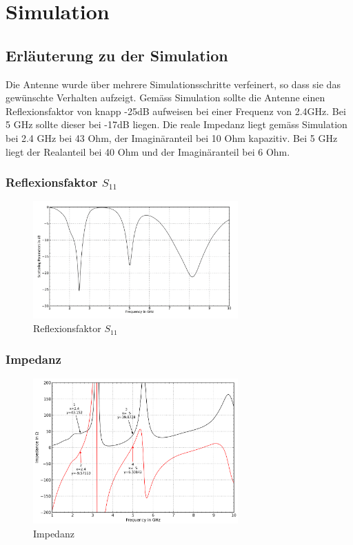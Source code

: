 \section{Simulation}

\subsection{Erläuterung zu der Simulation}
Die Antenne wurde über mehrere Simulationsschritte verfeinert, so dass sie das gewünschte Verhalten aufzeigt. Gemäss Simulation sollte die Antenne einen Reflexionsfaktor von knapp -25dB aufweisen bei einer Frequenz von 2.4GHz. Bei 5 GHz sollte dieser bei -17dB liegen. Die reale Impedanz liegt gemäss Simulation bei 2.4 GHz bei 43 Ohm, der Imaginäranteil bei 10 Ohm kapazitiv. Bei 5 GHz liegt der Realanteil bei 40 Ohm und der Imaginäranteil bei 6 Ohm.


\clearpage
\subsubsection{Reflexionsfaktor $S_{11}$}
\begin{figure}[h!]
	\centering
	\includegraphics[width=0.7\textwidth]{../fig/plt/crazy_stuff_l4_pcb_v2c_laptop_1a_105_S11_2.png}
	\caption{Reflexionsfaktor $S_{11}$}
\end{figure}

\subsubsection{Impedanz}
\begin{figure}[h!]
	\centering
	\includegraphics[width=0.7\textwidth]{../fig/plt/crazy_stuff_l4_pcb_v2c_laptop_1a_105_Widerstand_1.png}
	\caption{Impedanz}
\end{figure}

